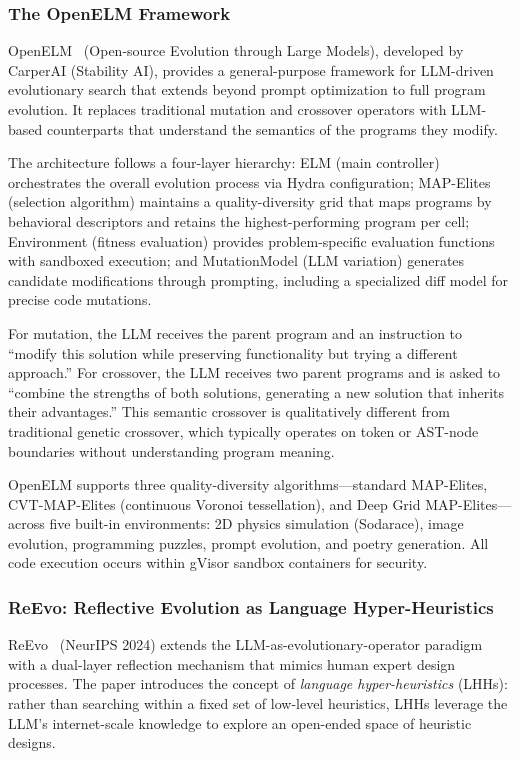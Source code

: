 \subsubsection{The OpenELM Framework}

OpenELM~\citep{openelm2023} (Open-source Evolution through Large Models), developed by CarperAI (Stability AI), provides a general-purpose framework for LLM-driven evolutionary search that extends beyond prompt optimization to full program evolution. It replaces traditional mutation and crossover operators with LLM-based counterparts that understand the semantics of the programs they modify.

The architecture follows a four-layer hierarchy: ELM (main controller) orchestrates the overall evolution process via Hydra configuration; MAP-Elites (selection algorithm) maintains a quality-diversity grid that maps programs by behavioral descriptors and retains the highest-performing program per cell; Environment (fitness evaluation) provides problem-specific evaluation functions with sandboxed execution; and MutationModel (LLM variation) generates candidate modifications through prompting, including a specialized diff model for precise code mutations.

For mutation, the LLM receives the parent program and an instruction to ``modify this solution while preserving functionality but trying a different approach.'' For crossover, the LLM receives two parent programs and is asked to ``combine the strengths of both solutions, generating a new solution that inherits their advantages.'' This semantic crossover is qualitatively different from traditional genetic crossover, which typically operates on token or AST-node boundaries without understanding program meaning.

OpenELM supports three quality-diversity algorithms---standard MAP-Elites, CVT-MAP-Elites (continuous Voronoi tessellation), and Deep Grid MAP-Elites---across five built-in environments: 2D physics simulation (Sodarace), image evolution, programming puzzles, prompt evolution, and poetry generation. All code execution occurs within gVisor sandbox containers for security.

\subsubsection{ReEvo: Reflective Evolution as Language Hyper-Heuristics}

ReEvo~\citep{reevo2024} (NeurIPS 2024) extends the LLM-as-evolutionary-operator paradigm with a dual-layer reflection mechanism that mimics human expert design processes. The paper introduces the concept of \emph{language hyper-heuristics} (LHHs): rather than searching within a fixed set of low-level heuristics, LHHs leverage the LLM's internet-scale knowledge to explore an open-ended space of heuristic designs.


